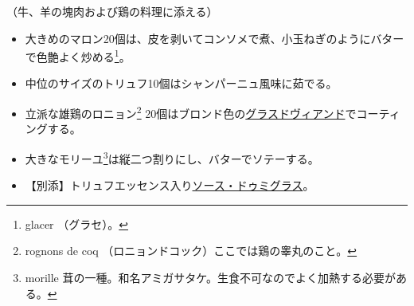 \begin{recette}
（牛、羊の塊肉および鶏の料理に添える）

\begin{itemize}
\item
  大きめのマロン20個は、皮を剥いてコンソメで煮、小玉ねぎのようにバターで色艶よく炒める\footnote{glacer
    （グラセ）。}。
\item
  中位のサイズのトリュフ10個はシャンパーニュ風味に茹でる。
\item
  立派な雄鶏のロニョン\footnote{rognons de coq
    （ロニョンドコック）ここでは鶏の睾丸のこと。}
  20個はブロンド色の\protect\hyperlink{glace-de-viande}{グラスドヴィアンド}でコーティングする。
\item
  大きなモリーユ\footnote{morille
    茸の一種。和名アミガサタケ。生食不可なのでよく加熱する必要がある。}は縦二つ割りにし、バターでソテーする。
\item
  【別添】トリュフエッセンス入り\protect\hyperlink{sauce-demi-glace}{ソース・ドゥミグラス}。
\end{itemize}

\atoaki{}

\hypertarget{garniture-godard}{%
}
\end{recette}
